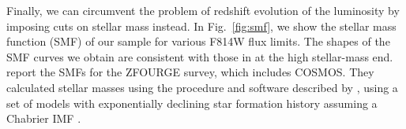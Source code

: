 \documentclass[twocolumn,useAMS,usenatbib]{mn2e}
\newcommand{\rachel}[1]{{\textcolor{red}{#1}}}
\newcommand{\arun}[1]{{\textcolor{blue}{#1}}}
\newcommand{\claire}[1]{{\textcolor{magenta}{#1}}}
\begin{document}


Finally, we can circumvent the problem of redshift evolution of the
luminosity by imposing cuts on stellar mass instead. In Fig.~\ref{fig:smf}, we show the stellar mass function (SMF) of our sample for various F814W flux limits.
The shapes of the SMF curves we obtain are consistent with those in \cite{Tomczak_SMF} at the high stellar-mass end.
\cite{Tomczak_SMF} report the SMFs for the ZFOURGE survey, which
includes COSMOS. They calculated stellar masses using the procedure
and software described by \cite{2009ApJ...700..221K}, using a set of models
with exponentially declining star formation history \citep{2003MNRAS.344.1000B} assuming a
Chabrier IMF \citep{ChabrierIMF}. 
\end{document}
